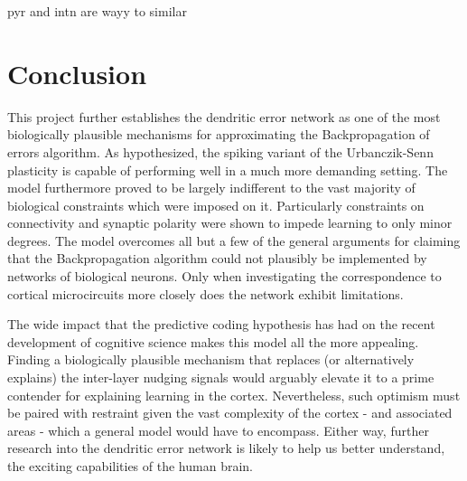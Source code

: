 pyr and intn are wayy to similar
\section{Conclusion}

This project further establishes the dendritic error network as one of the most biologically plausible mechanisms for
approximating the Backpropagation of errors algorithm. As hypothesized, the spiking variant of the Urbanczik-Senn
plasticity is capable of performing well in a much more demanding setting. The model furthermore proved to be largely
indifferent to the vast majority of biological constraints which were imposed on it. Particularly constraints on
connectivity and synaptic polarity were shown to impede learning to only minor degrees. The model overcomes all but a
few of the general arguments for claiming that the Backpropagation algorithm could not plausibly be implemented by
networks of biological neurons. Only when investigating the correspondence to cortical microcircuits more closely does
the network exhibit limitations. 

The wide impact that the predictive coding hypothesis has had on the recent development of cognitive science makes this
model all the more appealing. Finding a biologically plausible mechanism that replaces (or alternatively explains) the
inter-layer nudging signals would arguably elevate it to a prime contender for explaining learning in the cortex.
Nevertheless, such optimism must be paired with restraint given the vast complexity of the cortex - and associated areas
- which a general model would have to encompass. Either way, further research into the dendritic error network is likely
to help us better understand, the exciting capabilities of the human brain.